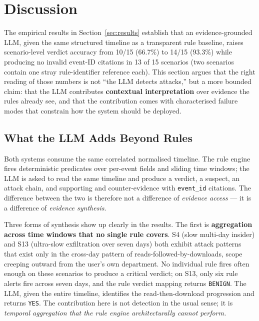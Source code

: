 \documentclass[conference]{IEEEtran}
\begin{document}
\section{Discussion}
\label{sec:discussion}

The empirical results in Section~\ref{sec:results} establish that an evidence-grounded LLM, given the same structured timeline as a transparent rule baseline, raises scenario-level verdict accuracy from 10/15 (66.7\%) to 14/15 (93.3\%) while producing no invalid event-ID citations in 13 of 15 scenarios (two scenarios contain one stray rule-identifier reference each). This section argues that the right reading of those numbers is not ``the LLM detects attacks,'' but a more bounded claim: that the LLM contributes \textbf{contextual interpretation} over evidence the rules already see, and that the contribution comes with characterised failure modes that constrain how the system should be deployed.

\subsection{What the LLM Adds Beyond Rules}
\label{sec:llm-adds}

Both systems consume the same correlated normalised timeline. The rule engine fires deterministic predicates over per-event fields and sliding time windows; the LLM is asked to read the same timeline and produce a verdict, a suspect, an attack chain, and supporting and counter-evidence with \texttt{event\_id} citations. The difference between the two is therefore not a difference of \emph{evidence access} --- it is a difference of \emph{evidence synthesis}.

Three forms of synthesis show up clearly in the results. The first is \textbf{aggregation across time windows that no single rule covers}. S4 (slow multi-day insider) and S13 (ultra-slow exfiltration over seven days) both exhibit attack patterns that exist only in the cross-day pattern of reads-followed-by-downloads, scope creeping outward from the user's own department. No individual rule fires often enough on these scenarios to produce a critical verdict; on S13, only six rule alerts fire across seven days, and the rule verdict mapping returns \texttt{BENIGN}. The LLM, given the entire timeline, identifies the read-then-download progression and returns \texttt{YES}. The contribution here is not detection in the usual sense; it is \emph{temporal aggregation that the rule engine architecturally cannot perform.}
\end{document}

